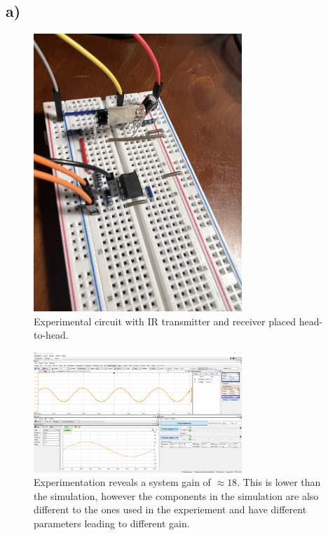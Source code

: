 \documentclass{article}
\begin{document}
	\subsection*{a)}
	
	\begin{figure}[H]
	    \centering
	    \includegraphics[width=0.7\textwidth]{c1}
	    \caption{Experimental circuit with IR transmitter and receiver placed head-to-head.}
	\end{figure}
	
	\begin{figure}[H]
	    \centering
	    \includegraphics[width=0.7\textwidth]{w1}
	    \caption{Experimentation reveals a system gain of $\approx 18$. This is lower than the simulation, however the components in the simulation are also different to the ones used in the experiement and have different parameters leading to different gain.}
	\end{figure}
	
\end{document}
